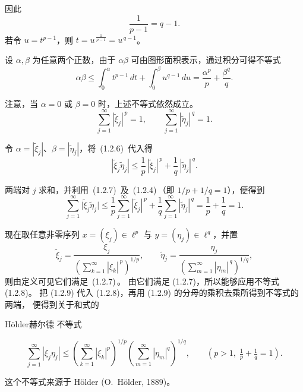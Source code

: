 因此 
\[
\frac{1}{p-1} = q-1.
\]
若令 $u = t^{p-1}$，则 $t = u^{\,\frac{1}{p-1}} = u^{\,q-1}$。

设 $\alpha,\beta$ 为任意两个正数，由于 $\alpha\beta$ 可由图形面积表示，通过积分可得不等式
\begin{equation}
\alpha \beta \leq \int_{0}^{\alpha} t^{p-1} \, dt + \int_{0}^{\beta} u^{q-1} \, du 
= \frac{\alpha^p}{p} + \frac{\beta^q}{q}. \tag{1.2.6}
\end{equation}

注意，当 $\alpha=0$ 或 $\beta=0$ 时，上述不等式依然成立。
\begin{equation}
\sum_{j=1}^{\infty} |\tilde\xi_j|^{\,p} = 1,
\qquad
\sum_{j=1}^{\infty} |\tilde\eta_j|^{\,q} = 1.
\tag{1.2.7}
\end{equation}

令 $\alpha = |\tilde\xi_j|$、$\beta = |\tilde\eta_j|$，将 \,(1.2.6)\, 代入得
\[
|\tilde\xi_j \tilde\eta_j|
\le \frac{1}{p}\,|\tilde\xi_j|^{\,p} + \frac{1}{q}\,|\tilde\eta_j|^{\,q}.
\]

两端对 $j$ 求和，并利用 \,(1.2.7)\, 及 \,(1.2.4)\,（即 $1/p + 1/q = 1$），便得到
\begin{equation}
\sum_{j=1}^{\infty} \bigl|\tilde\xi_j \tilde\eta_j\bigr|
\le \frac{1}{p}\sum_{j=1}^{\infty} |\tilde\xi_j|^{\,p}
   + \frac{1}{q}\sum_{j=1}^{\infty} |\tilde\eta_j|^{\,q}
= \frac{1}{p} + \frac{1}{q} = 1.
\tag{1.2.8}
\end{equation}

现在取任意非零序列 $x=(\xi_j)\in \ell^{p}$ 与 $y=(\eta_j)\in \ell^{q}$，并置
\begin{equation}
\tilde\xi_j = \frac{\xi_j}{\left(\displaystyle\sum_{k=1}^{\infty}|\xi_k|^{\,p}\right)^{1/p}},
\qquad
\tilde\eta_j = \frac{\eta_j}{\left(\displaystyle\sum_{m=1}^{\infty}|\eta_m|^{\,q}\right)^{1/q}},
\tag{1.2.9}
\end{equation}
则由定义可见它们满足 \,(1.2.7)\,。
由它们满足 (1.2.7)，所以能够应用不等式 (1.2.8)。
把 (1.2.9) 代入 (1.2.8)，再用 (1.2.9) 的分母的乘积去乘所得到不等式的两端，
便得到关于和式的 
\begin{theorem}{Hölder赫尔德 不等式}

\begin{equation}
\sum_{j=1}^{\infty} |\xi_j \eta_j|
\le
\left( \sum_{k=1}^{\infty} |\xi_k|^p \right)^{1/p}
\left( \sum_{m=1}^{\infty} |\eta_m|^q \right)^{1/q},
\qquad (p>1,\; \tfrac{1}{p}+\tfrac{1}{q}=1).
\tag{1.2.10}
\end{equation}
\end{theorem}
这个不等式来源于 Hölder (O.~Hölder, 1889)。

